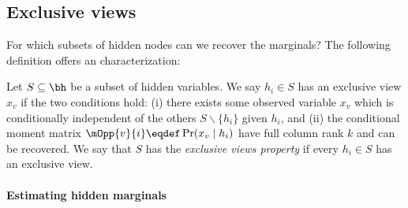 \subsection{Exclusive views}
\label{sec:general}

For which subsets of hidden nodes can we recover the marginals?  The following
definition offers an characterization:
\begin{definition}
  \label{def:exclusive-views}
Let $S \subseteq \bh$ be a subset of hidden variables.
We say $h_i \in S$ has an exclusive view $x_v$
  if the two conditions hold:
  (i) there exists some observed variable
  $x_{v}$ which is conditionally independent of the others $S \backslash \{ h_i \}$ given $h_i$,
  and (ii) the conditional moment matrix $\mOpp{v}{i} \eqdef
  \Pr(x_{v} \mid h_i)$ have full column rank $k$ and can be recovered.
We say that $S$ has the \emph{exclusive views property} if every $h_i \in S$ has an exclusive view.
\end{definition}

\paragraph{Estimating hidden marginals}

